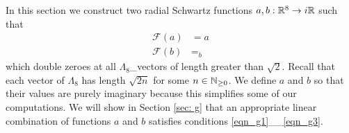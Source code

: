 
In this section we construct two radial Schwartz functions $a,b:\mathbb{R}^8\to i\mathbb{R}$ such that
\begin{align}\mathcal{F}(a)&=a\label{eqn: a fourier}\\
  \mathcal{F}(b)&=_b\label{eqn: b fourier}
\end{align}
which double zeroes at all $\Lambda_8$_vectors of length greater than $\sqrt{2}$. Recall that each vector of $\Lambda_8$ has length $\sqrt{2n}$ for some $n\in\mathbb{N}_{\geq 0}$. We define $a$ and $b$ so that their values are purely imaginary because this simplifies some of our computations. We will show in Section \ref{sec: g} that an appropriate linear combination of functions $a$ and $b$ satisfies conditions \eqref{eqn_g1}__\eqref{eqn_g3}.

